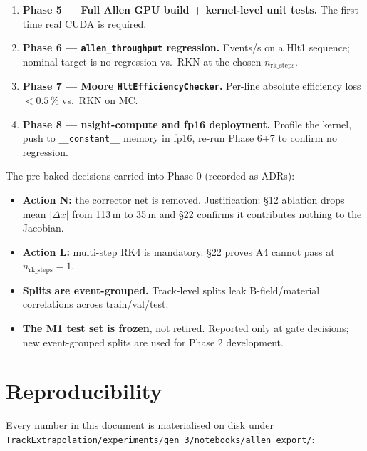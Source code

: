 \documentclass[11pt,a4paper]{article}
\begin{document}
\begin{enumerate}[leftmargin=2em,nosep]
      for the RKN baseline + V2 control; head-to-head vs.\ RKN.
\item \textbf{Phase 5 --- Full Allen GPU build + kernel-level unit
      tests.} The first time real CUDA is required.
\item \textbf{Phase 6 --- \texttt{allen\_throughput} regression.}
      Events/s on a Hlt1 sequence; nominal target is no regression
      vs.\ RKN at the chosen \(n_\mathrm{rk\_steps}\).
\item \textbf{Phase 7 --- Moore \texttt{HltEfficiencyChecker}.}
      Per-line absolute efficiency loss \(<\!0.5\,\%\) vs.\ RKN on
      MC.
\item \textbf{Phase 8 --- nsight-compute and fp16 deployment.}
      Profile the kernel, push to \texttt{\_\_constant\_\_} memory in
      fp16, re-run Phase 6+7 to confirm no regression.
\end{enumerate}

The pre-baked decisions carried into Phase 0 (recorded as ADRs):

\begin{itemize}[leftmargin=2em,nosep]
\item \textbf{Action N:} the corrector net is removed.
      Justification: \S12 ablation drops mean \(|\Delta x|\) from
      113\,\textmu m to 35\,\textmu m and \S22 confirms it
      contributes nothing to the Jacobian.
\item \textbf{Action L:} multi-step RK4 is mandatory. \S22 proves A4
      cannot pass at \(n_\mathrm{rk\_steps}=1\).
\item \textbf{Splits are event-grouped.} Track-level splits leak
      B-field/material correlations across train/val/test.
\item \textbf{The M1 test set is frozen}, not retired. Reported only
      at gate decisions; new event-grouped splits are used for Phase 2
      development.
\end{itemize}

\section{Reproducibility}

Every number in this document is materialised on disk under
\texttt{TrackExtrapolation/experiments/gen\_3/notebooks/allen\_export/}:
\end{document}
